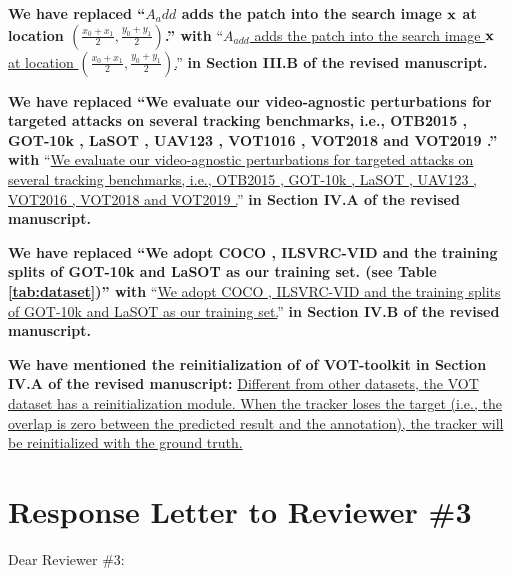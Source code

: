 \documentclass[12pt]{article}
\begin{document}
\textbf{We have  replaced ``$A_add$ adds the patch into the search image $\textbf x$ at location $(\frac{x_0+x_1}{2},\frac{y_0+y_1}{2})$.'' with}
``\uline{$A_{add}$ adds the patch into the search image $\textbf x$ at location $(\frac{x_0+x_1}{2},\frac{y_0+y_1}{2})$.}''
\textbf{in Section III.B of the revised manuscript.}

\textbf{We have replaced ``We evaluate our video-agnostic perturbations for targeted attacks on several tracking benchmarks, i.e., OTB2015 \cite{OTB}, GOT-10k \cite{GOT-10k}, LaSOT \cite{LaSOT}, UAV123 \cite{UAV123}, VOT1016 \cite{VOT2016}, VOT2018 \cite{VOT2018} and VOT2019 \cite{VOT2019}.'' with}
``\uline{We evaluate our video-agnostic perturbations for targeted attacks on several tracking benchmarks, i.e., OTB2015 \cite{OTB}, GOT-10k \cite{GOT-10k}, LaSOT \cite{LaSOT}, UAV123 \cite{UAV123}, VOT2016 \cite{VOT2016}, VOT2018 \cite{VOT2018} and VOT2019 \cite{VOT2019}.}''
\textbf{in Section IV.A of the revised manuscript.}

\textbf{We have replaced ``We adopt COCO \cite{COCO}, ILSVRC-VID \cite{VID} and the training splits of GOT-10k \cite{GOT-10k} and LaSOT \cite{LaSOT} as our training set. (see Table \ref{tab:dataset})'' with}
``\uline{We adopt COCO \cite{COCO}, ILSVRC-VID \cite{VID} and the training splits of GOT-10k \cite{GOT-10k} and LaSOT \cite{LaSOT} as our training set.}''
\textbf{in Section IV.B of the revised manuscript.}

\textbf{We have mentioned the reinitialization of of VOT-toolkit in Section IV.A of the revised manuscript:}
\uline{Different from other datasets, the VOT dataset has a reinitialization module. When the tracker loses the target (i.e., the overlap is zero between the predicted result and the annotation), the tracker will be reinitialized with the ground truth.}

\clearpage
\newpage
{\centering\section*{Response Letter to Reviewer \#3}}
\noindent Dear Reviewer \#3:
\end{document}
